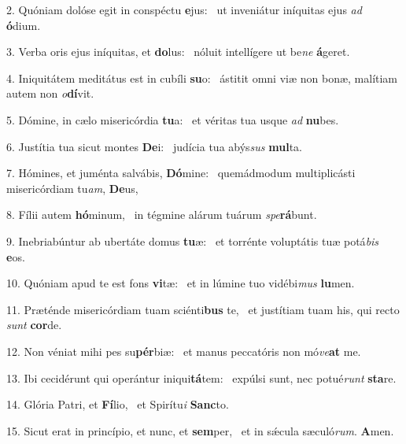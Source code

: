 2. Quóniam dolóse egit in conspéctu \textbf{e}jus: \ast\  ut inveniátur iníquitas ejus \textit{ad} \textbf{ó}dium.\

3. Verba oris ejus iníquitas, et \textbf{do}lus: \ast\  nóluit intellígere ut be\textit{ne} \textbf{á}geret.\

4. Iniquitátem meditátus est in cubíli \textbf{su}o: \ast\  ástitit omni viæ non bonæ, malítiam autem non \textit{o}\textbf{dí}vit.\

5. Dómine, in cælo misericórdia \textbf{tu}a: \ast\  et véritas tua usque \textit{ad} \textbf{nu}bes.\

6. Justítia tua sicut montes \textbf{De}i: \ast\  judícia tua abýs\textit{sus} \textbf{mul}ta.\

7. Hómines, et juménta salvábis, \textbf{Dó}mine: \ast\  quemádmodum multiplicásti misericórdiam tu\textit{am}, \textbf{De}us,\

8. Fílii autem \textbf{hó}minum, \ast\  in tégmine alárum tuárum \textit{spe}\textbf{rá}bunt.\

9. Inebriabúntur ab ubertáte domus \textbf{tu}æ: \ast\  et torrénte voluptátis tuæ potá\textit{bis} \textbf{e}os.\

10. Quóniam apud te est fons \textbf{vi}tæ: \ast\  et in lúmine tuo vidébi\textit{mus} \textbf{lu}men.\

11. Præténde misericórdiam tuam sciénti\textbf{bus} te, \ast\  et justítiam tuam his, qui recto \textit{sunt} \textbf{cor}de.\

12. Non véniat mihi pes su\textbf{pér}biæ: \ast\  et manus peccatóris non mó\textit{ve}\textbf{at} me.\

13. Ibi cecidérunt qui operántur iniqui\textbf{tá}tem: \ast\  expúlsi sunt, nec potué\textit{runt} \textbf{sta}re.\

14. Glória Patri, et \textbf{Fí}lio, \ast\  et Spirítu\textit{i} \textbf{Sanc}to.\

15. Sicut erat in princípio, et nunc, et \textbf{sem}per, \ast\  et in sǽcula sæculó\textit{rum}. \textbf{A}men.\

